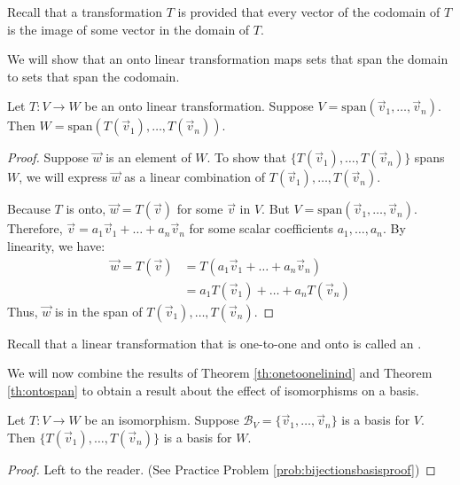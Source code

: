 \documentclass{ximera}
\begin{document}
Recall that a transformation $T$ is  provided that every vector of the codomain of $T$ is the image of some vector in the domain of $T$.  

We will show that an onto linear transformation maps sets that span the domain to sets that span the codomain. 

\begin{theorem}\label{th:ontospan}
Let $T:V\rightarrow W$ be an onto linear transformation.  Suppose $V=\text{span}(\vec{v}_1,\ldots ,\vec{v}_n)$.  Then $W=\text{span}(T(\vec{v}_1),\ldots ,T(\vec{v}_n))$.
\end{theorem}
\begin{proof}
Suppose $\vec{w}$ is an element of $W$. To show that $\{T(\vec{v}_1),\ldots ,T(\vec{v}_n)\}$ spans $W$, we will express $\vec{w}$ as a linear combination of $T(\vec{v}_1),\ldots ,T(\vec{v}_n)$.

Because $T$ is onto, $\vec{w}=T(\vec{v})$ for some $\vec{v}$ in $V$.  But $V=\text{span}(\vec{v}_1,\ldots ,\vec{v}_n)$.  Therefore, $\vec{v}=a_1\vec{v}_1+\ldots +a_n\vec{v}_n$ for some scalar coefficients $a_1,\ldots ,a_n$.
By linearity, we have:
\begin{align*}
\vec{w}=T(\vec{v})&=T(a_1\vec{v}_1+\ldots +a_n\vec{v}_n)\\
&=a_1T(\vec{v}_1)+\ldots +a_nT(\vec{v}_n)
\end{align*}
Thus, $\vec{w}$ is in the span of $T(\vec{v}_1),\ldots ,T(\vec{v}_n)$.
\end{proof}
 
Recall that a linear transformation that is one-to-one and onto is called an .

We will now combine the results of Theorem \ref{th:onetoonelinind} and Theorem \ref{th:ontospan} to obtain a result about the effect of isomorphisms on a basis.

\begin{theorem}\label{th:bijectionsbasis}
Let $T:V\rightarrow W$ be an isomorphism.  Suppose $\mathcal{B}_V=\{\vec{v}_1,\ldots ,\vec{v}_n\}$ is a basis for $V$.  Then $\{T(\vec{v}_1),\ldots ,T(\vec{v}_n)\}$ is a basis for $W$.
\end{theorem}
\begin{proof}
Left to the reader.  (See Practice Problem \ref{prob:bijectionsbasisproof}) 
\end{proof}
 
 
\end{document}
